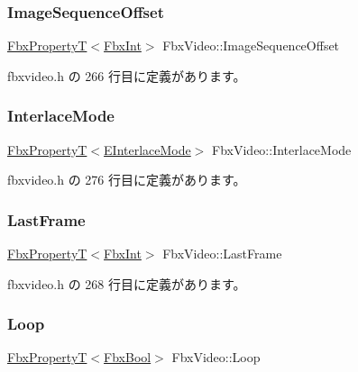 \subsubsection{\texorpdfstring{Image\+Sequence\+Offset}{ImageSequenceOffset}}
{\footnotesize\ttfamily \hyperlink{class_fbx_property_t}{Fbx\+PropertyT}$<$\hyperlink{fbxtypes_8h_a088fa96de3b0b3ea69f0f6afef525dfb}{Fbx\+Int}$>$ Fbx\+Video\+::\+Image\+Sequence\+Offset}



 fbxvideo.\+h の 266 行目に定義があります。

\mbox{\label{class_fbx_video_a624969738a09268e8897cffbe94e5188}} 
\subsubsection{\texorpdfstring{Interlace\+Mode}{InterlaceMode}}
{\footnotesize\ttfamily \hyperlink{class_fbx_property_t}{Fbx\+PropertyT}$<$\hyperlink{class_fbx_video_a1e60229c28a15e29289f3f00b23aa215}{E\+Interlace\+Mode}$>$ Fbx\+Video\+::\+Interlace\+Mode}



 fbxvideo.\+h の 276 行目に定義があります。

\mbox{\label{class_fbx_video_a30d7edd0fc1e23268702f5811327e526}} 
\subsubsection{\texorpdfstring{Last\+Frame}{LastFrame}}
{\footnotesize\ttfamily \hyperlink{class_fbx_property_t}{Fbx\+PropertyT}$<$\hyperlink{fbxtypes_8h_a088fa96de3b0b3ea69f0f6afef525dfb}{Fbx\+Int}$>$ Fbx\+Video\+::\+Last\+Frame}



 fbxvideo.\+h の 268 行目に定義があります。

\mbox{\label{class_fbx_video_aa325b2e04fac1593125ca02e6dc6a423}} 
\subsubsection{\texorpdfstring{Loop}{Loop}}
{\footnotesize\ttfamily \hyperlink{class_fbx_property_t}{Fbx\+PropertyT}$<$\hyperlink{fbxtypes_8h_a92e0562b2fe33e76a242f498b362262e}{Fbx\+Bool}$>$ Fbx\+Video\+::\+Loop}



